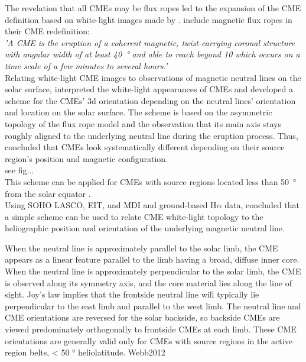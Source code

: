 The revelation that all CMEs may be flux ropes \citep{Vourlidas2013,Marubashi2015} led to the expansion of the CME definition based on white-light images made by \citet{Hundhausen1984}. \citet{Vourlidas2013,Vourlidas2014} include magnetic flux ropes in their CME redefinition:\\
\textit{'A CME is the eruption of a coherent magnetic, twist-carrying coronal structure with angular width of at least \SI{40}{\degree} and able to reach beyond \SI{10}{\Rs} which occurs on a time scale of a few minutes to several hours.'}\\

Relating white-light CME images to observations of magnetic neutral lines on the solar surface, \citet{Cremades2004} interpreted the white-light appearances of CMEs and developed a scheme for the CMEs' 3d orientation depending on the neutral lines' orientation and location on the solar surface. The scheme is based on the asymmetric topology of the flux rope model and the observation that its main axis stays roughly aligned to the underlying neutral line during the eruption process. Thus, \citet{Cremades2004} concluded that CMEs look systematically different depending on their source region's position and magnetic configuration.\\
see fig...\\

This scheme can be applied for CMEs with source regions located less than \SI{50}{\degree} from the solar equator \citep{Webb2012}.\\





Using SOHO LASCO, EIT, and MDI and ground-based H$\alpha$ data,  \citet{Cremades2004} concluded that a simple scheme can be used to relate CME white-light topology to the heliographic position and orientation of the underlying magnetic neutral line.

When the neutral line is approximately parallel to the solar limb, the CME appears as a linear feature parallel to the limb having a broad, diffuse inner core. When the neutral line is approximately perpendicular to the solar limb, the CME is observed along its symmetry axis, and the core material lies along the line of sight. Joy’s law implies that the frontside neutral line will typically lie perpendicular to the east limb and parallel to the west limb. The neutral line and CME orientations are reversed for the solar backside, so backside CMEs are viewed predominately orthogonally to frontside CMEs at each limb.
These CME orientations are generally valid only for CMEs with source regions in the active region belts, < 50 ° heliolatitude. Webb2012\\

